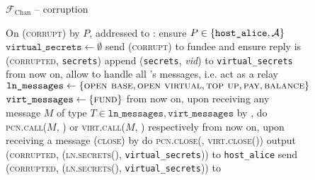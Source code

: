 \begin{figure}[H]
  \begin{systembox}{$\mathcal{F}_{\mathrm{Chan}}$ -- corruption}
    \begin{algorithmic}[1]
      \State On (\textsc{corrupt}) by $P$, addressed to \alice:
      \Indent
        \State ensure $P \in \{\texttt{host\_alice}, \mathcal{A}\}$
        \State $\texttt{virtual\_secrets} \gets \emptyset$
          \State send (\textsc{corrupt}) to fundee and ensure reply is
          (\textsc{corrupted}, \texttt{secrets})
          \State append (\texttt{secrets}, \textit{vid}) to
          \texttt{virtual\_secrets}
        \EndFor
        \State from now on, allow \adversary to handle all \alice's messages,
        i.e. act as a relay
          \State $\texttt{ln\_messages} \gets \{\textsc{open base}, \textsc{open
          virtual}, \textsc{top up}, \textsc{pay}, \textsc{balance}\}$
          \State $\texttt{virt\_messages} \gets \{\textsc{fund}\}$
          \State from now on, upon receiving any message $M$ of type $T \in
          \texttt{ln\_messages}, \texttt{virt\_messages}$ by \bob, do
          \textsc{pcn.call}($M$, \bob) or \textsc{virt.call}($M$, \bob)
          respectively
          \State from now on, upon receiving a message (\textsc{close}) by \bob
          do \textsc{pcn.close}(\bob, \textsc{virt.close}(\bob))
        \EndIf
          \State output (\textsc{corrupted}, (\textsc{ln.secrets}(\alice),
          \texttt{virtual\_secrets})) to \texttt{host\_alice}
        \Else \: 
          \State send (\textsc{corrupted}, (\textsc{ln.secrets}(\alice),
          \texttt{virtual\_secrets})) to \adversary
        \EndIf
      \EndIndent
    \end{algorithmic}
  \end{systembox}
  \caption{}
  \label{code:functionality:chan:skeleton:corruption}
\end{figure}
